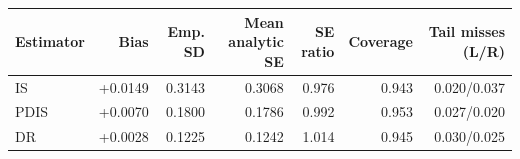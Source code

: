 \begin{tabular}{lrrrrrr}
\toprule
Estimator & Bias & Emp. SD & Mean analytic SE & SE ratio & Coverage & Tail misses (L/R) \\
\midrule
IS & +0.0149 & 0.3143 & 0.3068 & 0.976 & 0.943 & 0.020/0.037 \\
PDIS & +0.0070 & 0.1800 & 0.1786 & 0.992 & 0.953 & 0.027/0.020 \\
DR & +0.0028 & 0.1225 & 0.1242 & 1.014 & 0.945 & 0.030/0.025 \\
\bottomrule
\end{tabular}
